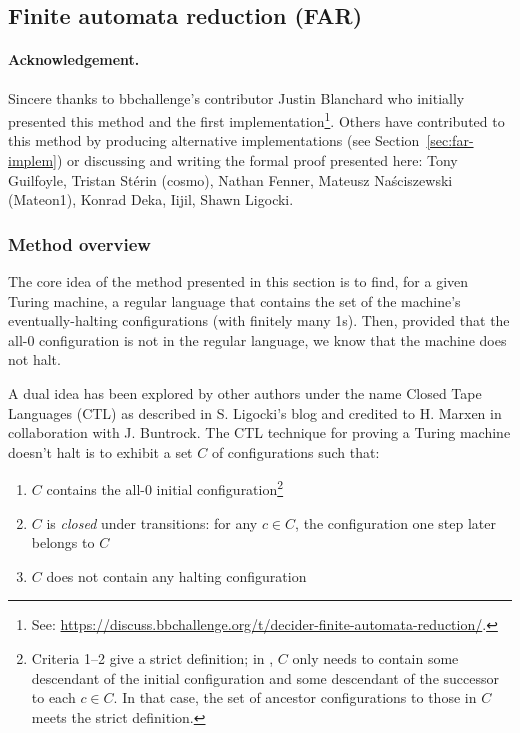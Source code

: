 
\newpage
\subsection{Finite automata reduction (FAR)}\label{sec:FAR}

\paragraph{Acknowledgement.} Sincere thanks to bbchallenge's contributor Justin Blanchard who initially presented this method and the first implementation\footnote{See: \url{https://discuss.bbchallenge.org/t/decider-finite-automata-reduction/}.}. Others have contributed to this method by producing alternative implementations (see Section~\ref{sec:far-implem}) or discussing and writing the formal proof presented here: Tony Guilfoyle, Tristan Stérin (cosmo), Nathan Fenner, Mateusz Naściszewski (Mateon1), Konrad Deka, Iijil, Shawn Ligocki. %


\subsubsection{Method overview}\label{far-overview}

The core idea of the method presented in this section is to find, for a given Turing machine, a regular language that contains the set of the machine's eventually-halting configurations (with finitely many 1s). Then, provided that the all-0 configuration is not in the regular language, we know that the machine does not halt.

A dual idea has been explored by other authors under the name Closed Tape Languages (CTL) as described in S. Ligocki's blog \cite{ShawnCTL} and credited to H. Marxen in collaboration with J. Buntrock.
The CTL technique for proving a Turing machine doesn't halt is to exhibit a set $C$ of configurations such that:

\begin{enumerate}
    \item $C$ contains the all-0 initial configuration\footnote{
              Criteria 1--2 give a strict definition; in \cite{ShawnCTL}, $C$ only needs to contain some descendant of the initial configuration and some descendant of the successor to each $c\in C$.
              In that case, the set of ancestor configurations to those in $C$ meets the strict definition.
          }
    \item $C$ is \textit{closed} under transitions: for any $c \in C$, the configuration one step later belongs to $C$\addtocounter{footnote}{-1}\addtocounter{Hfootnote}{-1}\footnotemark
    \item $C$ does not contain any halting configuration
\end{enumerate}


